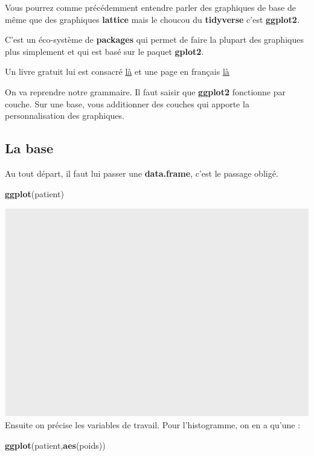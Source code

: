 \documentclass[
]{book}
\newenvironment{Shaded}{\begin{snugshade}}{\end{snugshade}}
\newcommand{\FunctionTok}[1]{\textcolor[rgb]{0.13,0.29,0.53}{\textbf{#1}}}
\newcommand{\NormalTok}[1]{#1}
\begin{document}
Vous pourrez comme précédemment entendre parler des graphiques de base de même
que des graphiques \textbf{lattice} mais le choucou du \textbf{tidyverse} c'est \textbf{ggplot2}.

C'est un éco-système de \textbf{packages} qui permet de faire la plupart des graphiques
plus simplement et qui est basé sur le paquet \textbf{gplot2}.

Un livre gratuit lui est consacré \href{https://ggplot2-book.org/}{là} et une page
en français \href{https://larmarange.github.io/analyse-R/graphiques-bivaries-ggplot2.html}{là}

On va reprendre notre grammaire. Il faut saisir que \textbf{ggplot2} fonctionne par
couche. Sur une base, vous additionner des couches qui apporte la personnalisation
des graphiques.

\subsection{La base}\label{la-base}

Au tout départ, il faut lui passer une \textbf{data.frame}, c'est le passage obligé.

\begin{Shaded}
\begin{Highlighting}[]
\FunctionTok{ggplot}\NormalTok{(patient)}
\end{Highlighting}
\end{Shaded}

\includegraphics{_main_files/figure-latex/ggplot1-1.pdf}
Ensuite on précise les variables de travail. Pour l'histogramme, on en a qu'une :

\begin{Shaded}
\begin{Highlighting}[]
\FunctionTok{ggplot}\NormalTok{(patient,}\FunctionTok{aes}\NormalTok{(poids))}
\end{Highlighting}
\end{Shaded}
\end{document}

